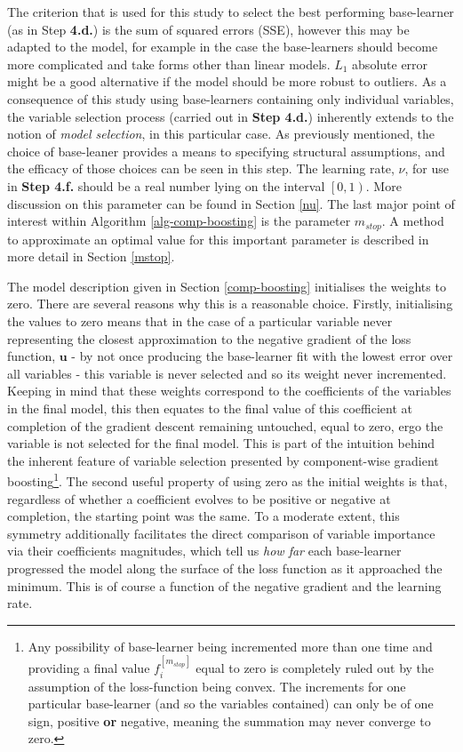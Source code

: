 \documentclass{article}
\begin{document}
\vspace{3mm}

The criterion that is used for this study to select the best performing base-learner (as in Step \textbf{4.d.}) is the sum of squared errors (SSE), however this may be adapted to the model, for example in the case the base-learners should become more complicated and take forms other than linear models. $L_1$ absolute error might be a good alternative if the model should be more robust to outliers.
As a consequence of this study using base-learners containing only individual variables, the variable selection process (carried out in \textbf{Step 4.d.}) inherently extends to the notion of \emph{model selection}, in this particular case. As previously mentioned, the choice of base-leaner provides a means to specifying structural assumptions, and the efficacy of those choices can be seen in this step. The learning rate, $\nu$, for use in \textbf{Step 4.f.} should be a real number lying on the interval $\left[0 , 1 \right)$. More discussion on this parameter can be found in Section \ref{nu}. The last major point of interest within Algorithm \eqref{alg-comp-boosting} is the parameter $m_{stop}$. A method to approximate an optimal value for this important parameter is described in more detail in Section \ref{mstop}.

The model description given in Section \ref{comp-boosting} initialises the weights to zero. There are several reasons why this is a reasonable choice. Firstly, initialising the values to zero means that in the case of a particular variable never representing the closest approximation to the negative gradient of the loss function, $\mathbf{u}$ - by not once producing the base-learner fit with the lowest error over all variables - this variable is never selected and so its weight never incremented. Keeping in mind that these weights correspond to the coefficients of the variables in the final model, this then equates to the final value of this coefficient at completion of the gradient descent remaining untouched, equal to zero, ergo the variable is not selected for the final model. This is part of the intuition behind the inherent feature of variable selection presented by component-wise gradient boosting\footnote{Any possibility of base-learner being incremented more than one time and providing a final value $f_{i}^{[m_{stop}]}$ equal to zero is completely ruled out by the assumption of the loss-function being convex. The increments for one particular base-learner (and so the variables contained) can only be of one sign, positive \textbf{or} negative, meaning the summation may never converge to zero.}.
The second useful property of using zero as the initial weights is that, regardless of whether a coefficient evolves to be positive or negative at completion, the starting point was the same. To a moderate extent, this symmetry additionally facilitates the direct comparison of variable importance via their coefficients magnitudes, which tell us \emph{how far} each base-learner progressed the model along the surface of the loss function as it approached the minimum. This is of course a function of the negative gradient and the learning rate.
\end{document}

